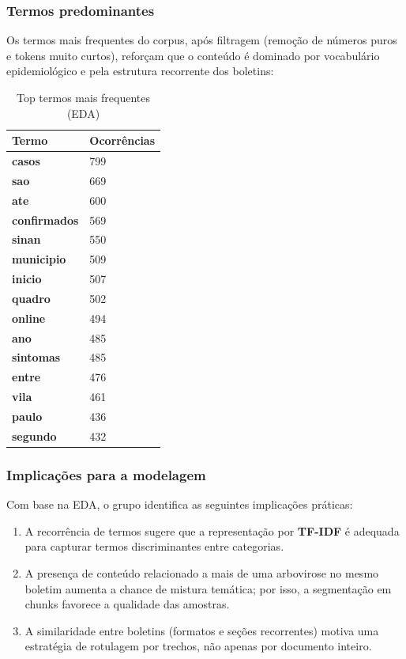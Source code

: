 \documentclass[12pt,a4paper]{article}
\begin{document}
\subsubsection{Termos predominantes}

Os termos mais frequentes do corpus, após filtragem (remoção de números puros e tokens muito curtos), reforçam que o conteúdo é dominado por vocabulário epidemiológico e pela estrutura recorrente dos boletins:

\begin{table}[htbp]
\centering
\renewcommand{\arraystretch}{1.15}
\begin{tabularx}{\textwidth}{>{\bfseries}l Y}
\toprule
Termo & Ocorrências \\
\midrule
casos & 799 \\
sao & 669 \\
ate & 600 \\
confirmados & 569 \\
sinan & 550 \\
municipio & 509 \\
inicio & 507 \\
quadro & 502 \\
online & 494 \\
ano & 485 \\
sintomas & 485 \\
entre & 476 \\
vila & 461 \\
paulo & 436 \\
segundo & 432 \\
\bottomrule
\end{tabularx}
\caption{Top termos mais frequentes (EDA)}
\label{tab:toptermos}
\end{table}

\subsubsection{Implicações para a modelagem}

Com base na EDA, o grupo identifica as seguintes implicações práticas:

\begin{enumerate}[leftmargin=1.2cm]
    \item A recorrência de termos sugere que a representação por \textbf{TF-IDF} é adequada para capturar termos discriminantes entre categorias.
    \item A presença de conteúdo relacionado a mais de uma arbovirose no mesmo boletim aumenta a chance de mistura temática; por isso, a segmentação em chunks favorece a qualidade das amostras.
    \item A similaridade entre boletins (formatos e seções recorrentes) motiva uma estratégia de rotulagem por trechos, não apenas por documento inteiro.
\end{enumerate}
\end{document}
